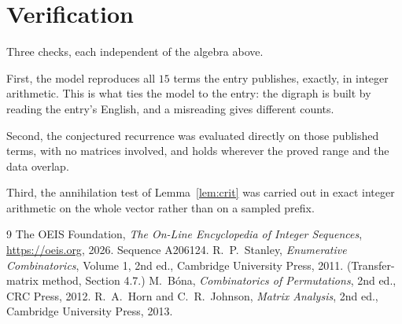 \documentclass[11pt,a4paper]{article}
\theoremstyle{plain}
\theoremstyle{definition}
\begin{document}
\section{Verification}

Three checks, each independent of the algebra above.

First, the model reproduces all $15$ terms the entry publishes, exactly, in integer
arithmetic. This is what ties the model to the entry: the digraph is built by reading the
entry's English, and a misreading gives different counts.

Second, the conjectured recurrence was evaluated directly on those published terms, with no
matrices involved, and holds wherever the proved range and the data overlap.

Third, the annihilation test of Lemma~\ref{lem:crit} was carried out in exact integer
arithmetic on the whole vector rather than on a sampled prefix.

\begin{thebibliography}{9}
 The OEIS Foundation, \emph{The On-Line Encyclopedia of Integer
Sequences}, \url{https://oeis.org}, 2026. Sequence A206124.
 R.~P.~Stanley, \emph{Enumerative Combinatorics}, Volume 1, 2nd ed.,
Cambridge University Press, 2011. (Transfer-matrix method, Section 4.7.)
 M.~B\'ona, \emph{Combinatorics of Permutations}, 2nd ed., CRC
Press, 2012.
 R.~A.~Horn and C.~R.~Johnson, \emph{Matrix Analysis}, 2nd ed., Cambridge
University Press, 2013.
\end{thebibliography}
\end{document}
